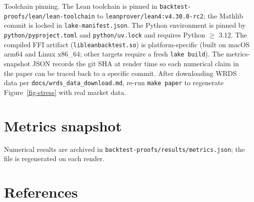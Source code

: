 \documentclass[
  11pt,
  letterpaper,
  DIV=12,
  numbers=noendperiod]{scrartcl}
\numberwithin{equation}{section}
\numberwithin{figure}{section}
\numberwithin{table}{section}
\let\quantproofsoldsection\section
\renewcommand{\section}{\clearpage\quantproofsoldsection}
\begin{document}
Toolchain pinning. The Lean toolchain is pinned in
\texttt{backtest-proofs/lean/lean-toolchain} to
\texttt{leanprover/lean4:v4.30.0-rc2}; the Mathlib commit is locked in
\texttt{lake-manifest.json}. The Python environment is pinned by
\texttt{python/pyproject.toml} and \texttt{python/uv.lock} and requires
Python \(\geq\) 3.12. The compiled FFI artifact
(\texttt{libleanbacktest.so}) is platform-specific (built on macOS arm64
and Linux x86\_64; other targets require a fresh \texttt{lake\ build}).
The metrics-snapshot JSON records the git SHA at render time so each
numerical claim in the paper can be traced back to a specific commit.
After downloading WRDS data per \texttt{docs/wrds\_data\_download.md},
re-run \texttt{make\ paper} to regenerate Figure~\ref{fig-stress} with
real market data.

\section{Metrics snapshot}\label{metrics-snapshot}

Numerical results are archived in
\texttt{backtest-proofs/results/metrics.json}; the file is regenerated
on each render.

\section*{References}\label{references}
\end{document}
